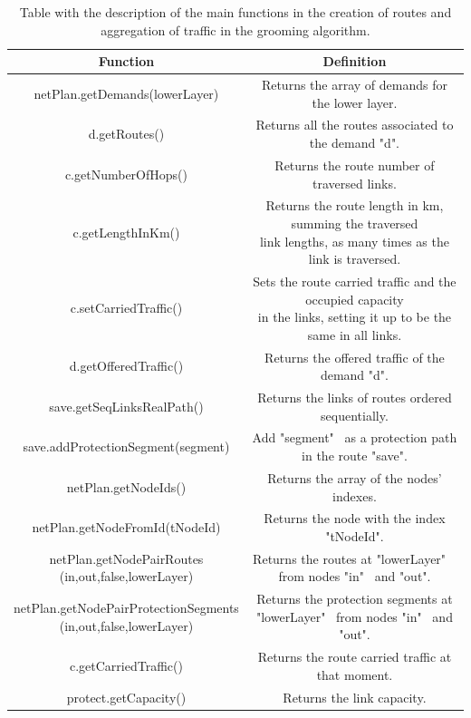 \begin{table}[H]
\centering
\begin{tabular}{|| c | c ||}
 \hline
 Function & Definition \\
 \hline\hline
 netPlan.getDemands(lowerLayer) & Returns the array of demands for the lower layer. \\
 \hline
 d.getRoutes() & Returns all the routes associated to the demand "d". \\
 \hline
 c.getNumberOfHops() & Returns the route number of traversed links. \\
 \hline
 c.getLengthInKm() & \makecell{Returns the route length in km, summing the traversed\\link lengths, as many times as the link is traversed.} \\
 \hline
 c.setCarriedTraffic() & \makecell{Sets the route carried traffic and the occupied capacity\\in the links, setting it up to be the same in all links.} \\
 \hline
 d.getOfferedTraffic() & Returns the offered traffic of the demand "d". \\
 \hline
 save.getSeqLinksRealPath() & Returns the links of routes ordered sequentially. \\
 \hline
 save.addProtectionSegment(segment) & Add "segment" \ as a protection path in the route "save". \\
 \hline
 netPlan.getNodeIds() & Returns the array of the nodes' indexes. \\
 \hline
 netPlan.getNodeFromId(tNodeId) & Returns the node with the index "tNodeId". \\
 \hline
 \makecell{netPlan.getNodePairRoutes\\(in,out,false,lowerLayer)} & \makecell{Returns the routes at "lowerLayer" \ \\from nodes "in" \ and "out".} \\
 \hline
 \makecell{netPlan.getNodePairProtectionSegments\\(in,out,false,lowerLayer)} & \makecell{Returns the protection segments at\\"lowerLayer" \ from nodes "in" \ and "out".} \\
 \hline
 c.getCarriedTraffic() & Returns the route carried traffic at that moment. \\
 \hline
 protect.getCapacity() & Returns the link capacity. \\
 \hline
\end{tabular}
\caption{Table with the description of the main functions in the creation of routes and aggregation of traffic in the grooming algorithm.}
\label{grooming_table_variables_translucent_protec}
\end{table}

